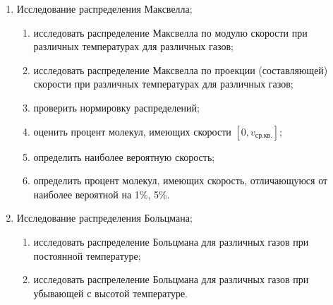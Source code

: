 \begin{enumerate} 
  \item Исследование распределения Максвелла; 
    \begin{enumerate} 
        \item исследовать распределение Максвелла по модулю скорости при различных температурах для различных газов; 
        \item исследовать распределение Максвелла по проекции (составляющей) скорости при различных температурах для различных газов; 
        \item проверить нормировку распределений;
        \item оценить процент молекул, имеющих скорости $[0, v_{\text{ср.кв.}}]$;
        \item определить наиболее вероятную скорость;
        \item определить процент молекул, имеющих скорость, отличающуюся от наиболее вероятной на 1\%, 5\%.
    \end{enumerate} 
  \item Исследование распределения Больцмана;
    \begin{enumerate}
        \item исследовать распределение Больцмана для различных газов при постоянной температуре;
        \item исследовать распрелеление Больцмана для различных газов при убывающей с высотой температуре. 
    \end{enumerate}
\end{enumerate}

